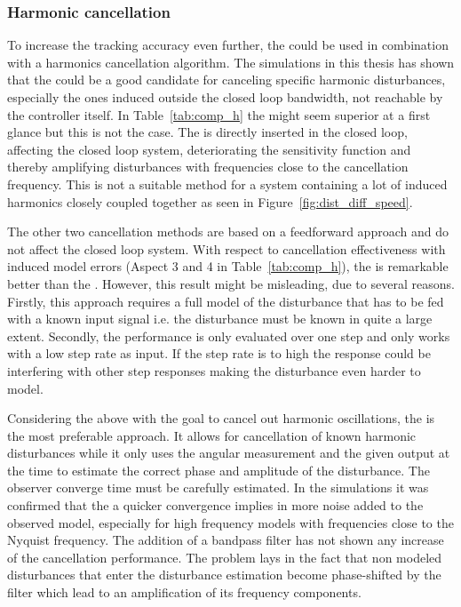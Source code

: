 \subsubsection{Harmonic cancellation}
To increase the tracking accuracy even further, the \abbrIRC could be used in combination with a harmonics cancellation algorithm. The simulations in this thesis has shown that the \abbrRFDC could be a good candidate for canceling specific harmonic disturbances, especially the ones induced outside the closed loop bandwidth, not reachable by the controller itself. In Table~\ref{tab:comp_h} the \abbrIMP might seem superior at a first glance but this is not the case. The \abbrIMP is directly inserted in the closed loop, affecting the closed loop system, deteriorating the sensitivity function and thereby amplifying disturbances with frequencies close to the cancellation frequency. This is not a suitable method for a system containing a lot of induced harmonics closely coupled together as seen in Figure~\ref{fig:dist_diff_speed}.

The other two cancellation methods are based on a feedforward approach and do not affect the closed loop system. With respect to cancellation effectiveness with induced model errors (Aspect 3 and 4 in Table~\ref{tab:comp_h}), the \abbrFDC is remarkable better than the \abbrRFDC. However, this result might be misleading, due to several reasons. Firstly, this approach requires a full model of the disturbance that has to be fed with a known input signal i.e. the disturbance must be known in quite a large extent. Secondly, the \abbrFDC performance is only evaluated over one step and only works with a low step rate as input. If the step rate is to high the response could be interfering with other step responses making the disturbance even harder to model.

Considering the above with the goal to cancel out harmonic oscillations, the \abbrRFDC is the most preferable approach. It allows for cancellation of known harmonic disturbances while it only uses the angular measurement and the given output at the time to estimate the correct phase and amplitude of the disturbance. The observer converge time must be carefully estimated. In the simulations it was confirmed that the a quicker convergence implies in more noise added to the observed model, especially for high frequency models with frequencies close to the Nyquist frequency. The addition of a bandpass filter has not shown any increase of the cancellation performance. The problem lays in the fact that non modeled disturbances that enter the disturbance estimation become phase-shifted by the filter which lead to an amplification of its frequency components.

